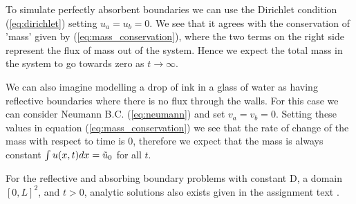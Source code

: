 \documentclass[5p,sort&compress]{elsarticle}
\numberwithin{equation}{subsection}
\begin{document}
To simulate perfectly absorbent boundaries we can use the Dirichlet condition (\ref{eq:dirichlet}) setting $u_a = u_b = 0$. We see that it agrees with the conservation of 'mass' given by (\ref{eq:mass_conservation}), where the two terms on the right side represent the flux of mass out of the system. Hence we expect the total mass in the system to go towards zero as $t \rightarrow \infty$.

We can also imagine modelling a drop of ink in a glass of water as having reflective boundaries where there is no flux through the walls. For this case we can consider Neumann B.C. (\ref{eq:neumann}) and set $v_a = v_b = 0$. Setting these values in equation (\ref{eq:mass_conservation}) we see that the rate of change of the mass with respect to time is 0, therefore we expect that the mass is always constant $\int u(x,t)dx = \Tilde{u}_0$ for all $t$.

For the reflective and absorbing boundary problems with constant D, a domain $[0, L]^2$, and $t>0$, analytic solutions also exists given in the assignment text \cite{assignment}. 

    
\end{document}
